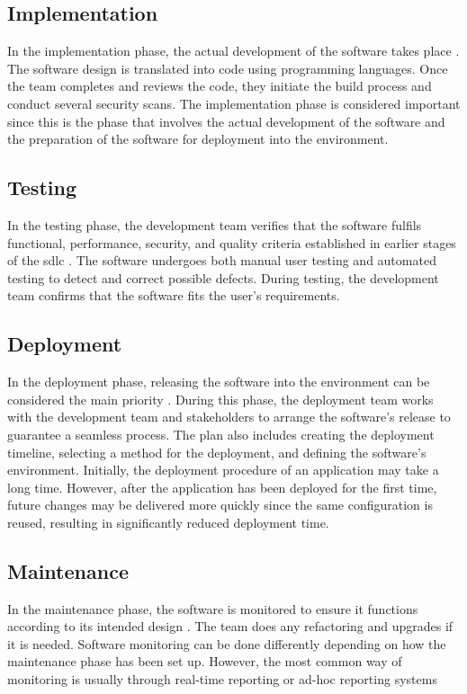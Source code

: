 \subsection{Implementation}
In the implementation phase, the actual development of the software takes place \cite{ImplementationSDLC}. The software design is translated into code using programming languages. Once the team completes and reviews the code, they initiate the build process and conduct several security scans. The implementation phase is considered important since this is the phase that involves the actual development of the software and the preparation of the software for deployment into the environment.  
 
\subsection{Testing}
In the testing phase, the development team verifies that the software fulfils functional, performance, security, and quality criteria established in earlier stages of the \acrshort{sdlc} \cite{TestingSDLC}. The software undergoes both manual user testing and automated testing to detect and correct possible defects. During testing, the development team confirms that the software fits the user's requirements.
 \newpage
\subsection{Deployment}
In the deployment phase, releasing the software into the environment can be considered the main priority \cite{DeploymentSDLC}. During this phase, the deployment team works with the development team and stakeholders to arrange the software's release to guarantee a seamless process. The plan also includes creating the deployment timeline, selecting a method for the deployment, and defining the software's environment. Initially, the deployment procedure of an application may take a long time. However, after the application has been deployed for the first time, future changes may be delivered more quickly since the same configuration is reused, resulting in significantly reduced deployment time. 

\subsection{Maintenance} 
In the maintenance phase, the software is monitored to ensure it functions according to its intended design \cite{MaintenanceSDLC}. The team does any refactoring and upgrades if it is needed. Software monitoring can be done differently depending on how the maintenance phase has been set up. However, the most common way of monitoring is usually through real-time reporting or ad-hoc reporting systems


